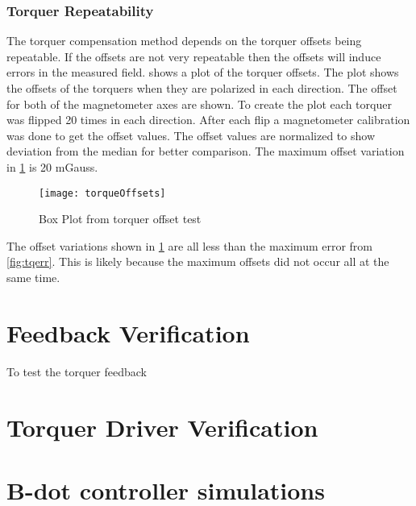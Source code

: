 \subsubsection{Torquer Repeatability}

The torquer compensation method depends on the torquer offsets being repeatable. If the offsets are not very repeatable then the offsets will induce errors in the measured field.  shows a plot of the torquer offsets. The plot shows the offsets of the torquers when they are polarized in each direction. The offset for both of the magnetometer axes are shown. To create the plot each torquer was flipped 20 times in each direction. After each flip a magnetometer calibration was done to get the offset values. The offset values are normalized to show deviation from the median for better comparison. The maximum offset variation in \cref{fig:tqoff} is 20 mGauss.

\begin{figure}[!ht]
    \centering
    \texttt{[image: torqueOffsets]}
    \caption{Box Plot from torquer offset test}
    \label{fig:tqoff}
\end{figure}

The offset variations shown in \cref{fig:tqoff} are all less than the maximum error from \cref{fig:tqerr}. This is likely because the maximum offsets did not occur all at the same time.

\section{Feedback Verification}

To test the torquer feedback 


\section{Torquer Driver Verification}


\section{B-dot controller simulations}


